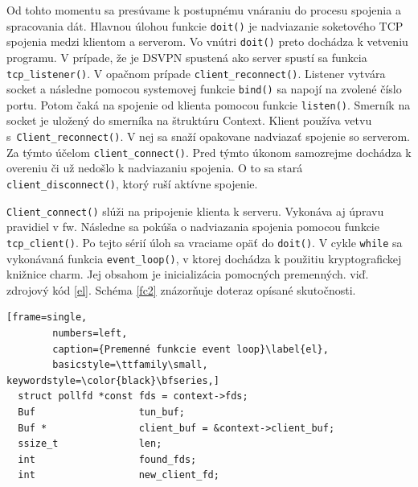 Od tohto momentu sa presúvame k postupnému vnáraniu do procesu spojenia a spracovania dát. Hlavnou úlohou funkcie \lstinline|doit()| je nadviazanie soketového TCP spojenia medzi klientom a serverom. Vo vnútri \lstinline|doit()| preto dochádza k vetveniu programu. V prípade, že je DSVPN spustená ako server spustí sa funkcia \lstinline|tcp_listener()|. V opačnom prípade \lstinline|client_reconnect()|. Listener vytvára socket a následne pomocou systemovej funkcie \lstinline|bind()| sa napojí na zvolené číslo portu. Potom čaká na spojenie od klienta pomocou funkcie \lstinline|listen()|. Smerník na socket je uložený do smerníka na štruktúru Context.
Klient používa vetvu s~\lstinline|Client_reconnect()|. V nej sa snaží opakovane nadviazať spojenie so serverom. Za týmto účelom \lstinline|client_connect()|. Pred týmto úkonom samozrejme dochádza k overeniu či už nedošlo k nadviazaniu spojenia. O to sa stará \\\lstinline|client_disconnect()|, ktorý ruší aktívne spojenie.

\lstinline|Client_connect()| slúži na pripojenie klienta k serveru. Vykonáva aj úpravu pravidiel v \acrshort{fw}. Následne sa pokúša o nadviazania spojenia pomocou funkcie  \lstinline|tcp_client()|. Po tejto sérií úloh sa vraciame opäť do \lstinline|doit()|. V cykle \lstinline|while| sa vykonávaná funkcia \lstinline|event_loop()|, v ktorej dochádza k použitiu kryptografickej knižnice charm. Jej obsahom je inicializácia pomocných premenných. viď. zdrojový kód \ref{el}. Schéma \ref{fc2} znázorňuje doteraz opísané skutočnosti.
  
  \begin{minipage}{\linewidth} 	
  	\begin{lstlisting}[frame=single,
  		numbers=left,
  		caption={Premenné funkcie event loop}\label{el},
  		basicstyle=\ttfamily\small, keywordstyle=\color{black}\bfseries,]
  struct pollfd *const fds = context->fds;
  Buf                  tun_buf;
  Buf *                client_buf = &context->client_buf;
  ssize_t              len;
  int                  found_fds;
  int                  new_client_fd;
    	\end{lstlisting}
\end{minipage}\\ 
 
 

